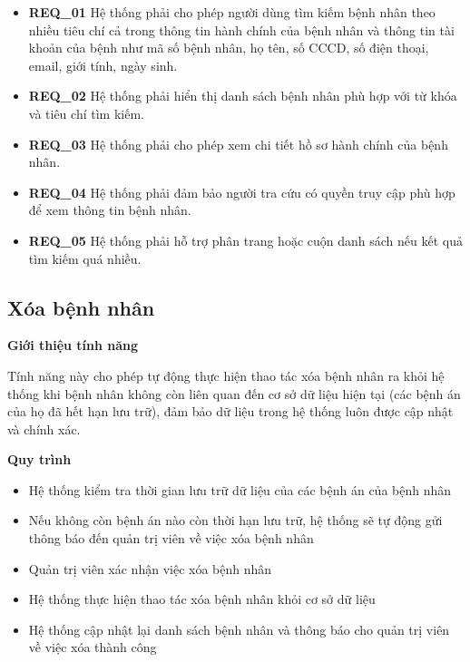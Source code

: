 \begin{itemize}

  \item \textbf{REQ\_01} Hệ thống phải cho phép người dùng tìm kiếm bệnh nhân theo nhiều tiêu chí cả trong thông tin hành chính của bệnh nhân và thông tin tài khoản của bệnh như mã số bệnh nhân, họ tên, số CCCD, số điện thoại, email, giới tính, ngày sinh.

  \item \textbf{REQ\_02} Hệ thống phải hiển thị danh sách bệnh nhân phù hợp với từ khóa và tiêu chí tìm kiếm.

  \item \textbf{REQ\_03} Hệ thống phải cho phép xem chi tiết hồ sơ hành chính của bệnh nhân.

  \item \textbf{REQ\_04} Hệ thống phải đảm bảo người tra cứu có quyền truy cập phù hợp để xem thông tin bệnh nhân.

  \item \textbf{REQ\_05} Hệ thống phải hỗ trợ phân trang hoặc cuộn danh sách nếu kết quả tìm kiếm quá nhiều.

\end{itemize}

\subsection{Xóa bệnh nhân}

\noindent \textbf{Giới thiệu tính năng}

Tính năng này cho phép tự động thực hiện thao tác xóa bệnh nhân ra khỏi hệ thống khi bệnh nhân không còn liên quan đến cơ sở dữ liệu hiện tại (các bệnh án của họ đã hết hạn lưu trữ), đảm bảo dữ liệu trong hệ thống luôn được cập nhật và chính xác.

\noindent \textbf{Quy trình}

\begin{itemize}

  \item Hệ thống kiểm tra thời gian lưu trữ dữ liệu của các bệnh án của bệnh nhân

  \item Nếu không còn bệnh án nào còn thời hạn lưu trữ, hệ thống sẽ tự động gửi thông báo đến quản trị viên về việc xóa bệnh nhân

  \item Quản trị viên xác nhận việc xóa bệnh nhân

  \item Hệ thống thực hiện thao tác xóa bệnh nhân khỏi cơ sở dữ liệu

  \item Hệ thống cập nhật lại danh sách bệnh nhân và thông báo cho quản trị viên về việc xóa thành công

\end{itemize}

